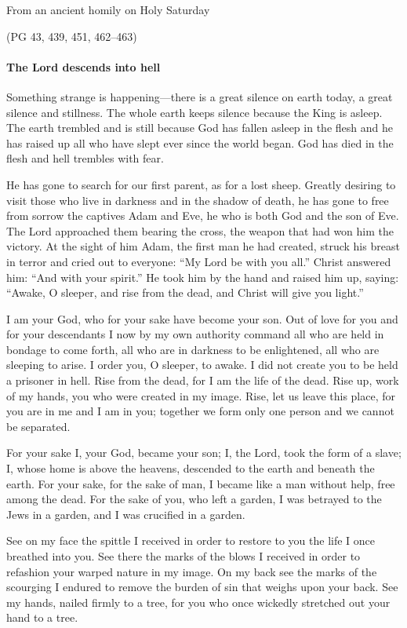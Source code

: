 From an ancient homily on Holy Saturday

\par \hfill(PG 43, 439, 451, 462--463)

\paragraph{The Lord descends into hell}

\lettrine[lines=3]{S}{}omething strange is happening—there is a great silence on earth today, a great silence and stillness. The whole earth keeps silence because the King is asleep. The earth trembled and is still because God has fallen asleep in the flesh and he has raised up all who have slept ever since the world began. God has died in the flesh and hell trembles with fear.

He has gone to search for our first parent, as for a lost sheep. Greatly desiring to visit those who live in darkness and in the shadow of death, he has gone to free from sorrow the captives Adam and Eve, he who is both God and the son of Eve. The Lord approached them bearing the cross, the weapon that had won him the victory. At the sight of him Adam, the first man he had created, struck his breast in terror and cried out to everyone: “My Lord be with you all.” Christ answered him: “And with your spirit.” He took him by the hand and raised him up, saying: “Awake, O sleeper, and rise from the dead, and Christ will give you light.”

I am your God, who for your sake have become your son. Out of love for you and for your descendants I now by my own authority command all who are held in bondage to come forth, all who are in darkness to be enlightened, all who are sleeping to arise. I order you, O sleeper, to awake. I did not create you to be held a prisoner in hell. Rise from the dead, for I am the life of the dead. Rise up, work of my hands, you who were created in my image. Rise, let us leave this place, for you are in me and I am in you; together we form only one person and we cannot be separated.

For your sake I, your God, became your son; I, the Lord, took the form of a slave; I, whose home is above the heavens, descended to the earth and beneath the earth. For your sake, for the sake of man, I became like a man without help, free among the dead. For the sake of you, who left a garden, I was betrayed to the Jews in a garden, and I was crucified in a garden.

See on my face the spittle I received in order to restore to you the life I once breathed into you. See there the marks of the blows I received in order to refashion your warped nature in my image. On my back see the marks of the scourging I endured to remove the burden of sin that weighs upon your back. See my hands, nailed firmly to a tree, for you who once wickedly stretched out your hand to a tree.

